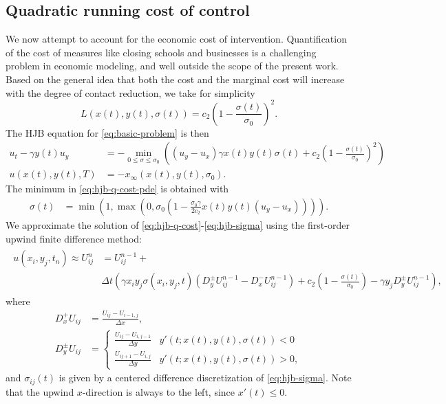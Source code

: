 \documentclass[english,12pt,letter]{article}
\newcommand{\Rnot}{\sigma_0}
\newcommand{\Sinf}{x_\infty}
\newcommand{\Dt}{\Delta t}
\newcommand{\Dx}{\Delta x}
\newcommand{\Dy}{\Delta y}
\begin{document}
\subsection{Quadratic running cost of control}
We now attempt to account for the economic cost of intervention.  Quantification
of the cost of measures like closing schools and businesses is a challenging
problem in economic modeling, and well outside the scope of the present work.
Based on the general idea that both the cost and the marginal cost will increase
with the degree of contact reduction, we take for simplicity
$$
    L(x(t),y(t),\sigma(t)) = c_2 \left(1-\frac{\sigma(t)}{\Rnot}\right)^2.
$$
The HJB equation for \eqref{eq:basic-problem} is then
\begin{subequations} \label{eq:hjb-q-cost}
\begin{align} \label{eq:hjb-q-cost-pde}
    u_t - \gamma y(t) u_y & = - \min_{0\le \sigma\le \Rnot} \left((u_y-u_x)\gamma x(t) y(t) \sigma(t) + c_2 \left(1-\frac{\sigma(t)}{\Rnot}\right)^2 \right) \\
    u(x(t),y(t),T) & = -\Sinf(x(t),y(t),\Rnot).
\end{align}
\end{subequations}
The minimum in \eqref{eq:hjb-q-cost-pde} is obtained with
\begin{align} \label{eq:hjb-sigma}
    \sigma(t) & = \min\left(1,\max\left(0,\Rnot\left(1-\frac{\Rnot\gamma}{2c_2}x(t) y(t) (u_y-u_x)\right)\right)\right).
\end{align}
We approximate the solution of \eqref{eq:hjb-q-cost}-\eqref{eq:hjb-sigma} using the first-order
upwind finite difference method:
\begin{align}
\begin{split}
    u(x_i,y_j,t_n) \approx U^{n}_{ij} & = U^{n-1}_{ij} + \\
    & \Dt \left(\gamma x_i y_j \sigma(x_i, y_j, t) (D^\pm_y U^{n-1}_{ij} - D^-_x U^{n-1}_{ij}) 
        + c_2\left(1-\frac{\sigma(t)}{\Rnot}\right) - \gamma y_j D^\pm_y U^{n-1}_{ij}\right),
\end{split}
\end{align}
where
\begin{align*}
    D^+_x U_{ij} & = \frac{U_{ij}-U_{i-1,j}}{\Dx}, \\
    D^\pm_y U_{ij} & =
    \begin{cases}
        \frac{U_{ij}-U_{i,j-1}}{\Dy} & y'(t;x(t),y(t),\sigma(t))<0 \\
        \frac{U_{ij+1}-U_{i,j}}{\Dy} & y'(t;x(t),y(t),\sigma(t))>0,
    \end{cases}
\end{align*}
and $\sigma_{ij}(t)$ is given by a centered difference discretization of \eqref{eq:hjb-sigma}.
Note that the upwind $x$-direction is always to the left, since $x'(t)\le0$.
\end{document}

